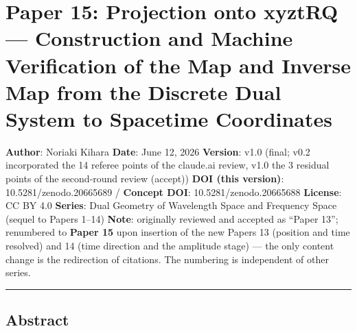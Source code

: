 \documentclass[
]{article}
\author{}
\date{}
\begin{document}
\section{Paper 15: Projection onto xyztRQ --- Construction and Machine
Verification of the Map and Inverse Map from the Discrete Dual System to
Spacetime
Coordinates}\label{paper-15-projection-onto-xyztrq-construction-and-machine-verification-of-the-map-and-inverse-map-from-the-discrete-dual-system-to-spacetime-coordinates}

\textbf{Author}: Noriaki Kihara \textbf{Date}: June 12, 2026
\textbf{Version}: v1.0 (final; v0.2 incorporated the 14 referee points
of the claude.ai review, v1.0 the 3 residual points of the second-round
review (accept)) \textbf{DOI (this version)}: 10.5281/zenodo.20665689 /
\textbf{Concept DOI}: 10.5281/zenodo.20665688 \textbf{License}: CC BY
4.0 \textbf{Series}: Dual Geometry of Wavelength Space and Frequency
Space (sequel to Papers 1--14) \textbf{Note}: originally reviewed and
accepted as ``Paper 13''; renumbered to \textbf{Paper 15} upon insertion
of the new Papers 13 (position and time resolved) and 14 (time direction
and the amplitude stage) --- the only content change is the redirection
of citations. The numbering is independent of other series.

\begin{center}\rule{0.5\linewidth}{0.5pt}\end{center}

\subsection{Abstract}\label{abstract}
\end{document}
